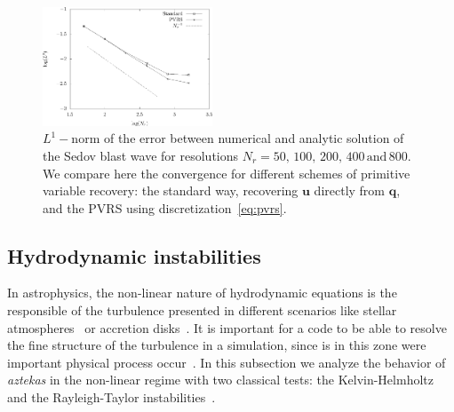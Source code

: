 \begin{figure}
    \centering
    \includegraphics[width=0.45\textwidth]{Figures/lnorm_sedov.eps}
    \caption{$L^1-$norm of the error between numerical and analytic solution of the Sedov blast wave for resolutions $N_r = 50,\, 100,\, 200,\, 400\, \mathrm{and}\, 800$. We compare here the convergence for different schemes of primitive variable recovery: the standard way, recovering $\mathbf{u}$ directly from $\mathbf{q}$, and the PVRS using discretization~\eqref{eq:pvrs}.}
    \label{fig:lnorm-sedov}
\end{figure}




\subsection{Hydrodynamic instabilities}
\label{subsec:hydinst}

In astrophysics, the non-linear nature of hydrodynamic equations is the responsible of the turbulence presented in different scenarios like stellar atmospheres~\citep[see][]{jeffrey2018} or accretion disks~\citep[see][]{wienkers2018}. It is important for a code to be able to resolve the fine structure of the turbulence in a simulation, since is in this zone were important physical process occur~\citep[eg.][]{duffel2016}. In this subsection we analyze the behavior of \textit{aztekas} in the non-linear regime with two classical tests: the Kelvin-Helmholtz and the Rayleigh-Taylor instabilities~\citep{chandra1981}.

